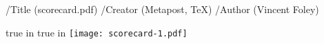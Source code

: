 \pdfinfo
  { /Title          (scorecard.pdf)
    /Creator        (Metapost, TeX)
    /Author         (Vincent Foley) }



\resetatcatcode
{} true in
 true in
\topmargin 0.75cm
\bottommargin 0.75cm
\leftmargin 1.00cm
\rightmargin 0.75cm
\nopagenumbers
\parindent=0pt\parskip=8pt
\vfill
\texttt{[image: scorecard-1.pdf]}
\vfill\eject
\bye
